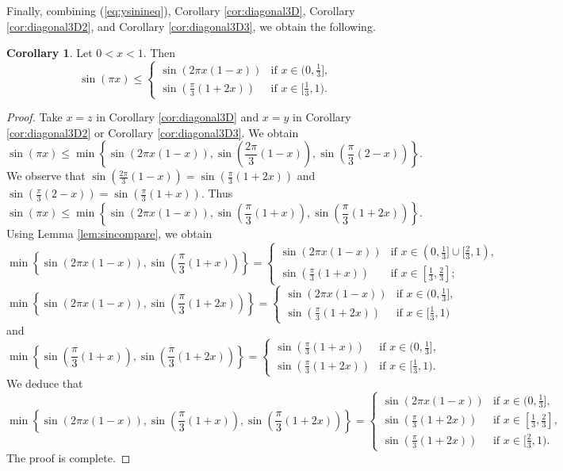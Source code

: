 \documentclass[12pt]{amsart}
\theoremstyle{definition}
\newtheorem{corollary}{Corollary}[section]
\begin{document}
Finally, combining (\ref{eq:ysinineq}), Corollary \ref{cor:diagonal3D}, Corollary \ref{cor:diagonal3D2}, and Corollary \ref{cor:diagonal3D3}, we obtain the following.
\begin{corollary}\label{cor:3Dto1D}
 Let $0<x<1$. Then
 \[
 \sin(\pi x)\leq \begin{cases}
    \sin\left(2\pi x(1-x)\right)
    & \text{if } x\in(0,\frac 13], \\[10pt]
    \sin\left(\frac{\pi}{3}(1+2x)\right)
    & \text{if } x\in[\frac 13,1).
  \end{cases}\]
\end{corollary}
\begin{proof}
Take $x=z$ in Corollary \ref{cor:diagonal3D}
and $x=y$ in Corollary \ref{cor:diagonal3D2} or Corollary \ref{cor:diagonal3D3}. We obtain
$$\sin(\pi x)\leq \min\left\{\sin(2\pi x(1-x)),\sin\left(\frac{2\pi}{3}(1-x)\right),\sin\left(\frac{\pi}{3}(2-x)\right)\right\}.$$
We observe that $\sin\left(\frac{2\pi}{3}(1-x)\right)=\sin\left(\frac{\pi}{3}(1+2x)\right)$ and $\sin\left(\frac{\pi}{3}(2-x)\right)=\sin\left(\frac{\pi}{3}(1+x)\right)$. Thus   $$\sin(\pi x)\leq \min\left\{\sin(2\pi x(1-x)),\sin\left(\frac{\pi}{3}(1+x)\right),\sin\left(\frac{\pi}{3}(1+2x)\right)\right\}.$$
Using Lemma \ref{lem:sincompare}, we obtain
\[
 \min\left\{\sin(2\pi x(1-x)),\sin\left(\frac{\pi}{3}(1+x)\right)\right\}= \begin{cases}
    \sin\left(2\pi x(1-x)\right)
    & \text{if } x\in(0,\frac 13]\cup [\frac 23,1), \\[10pt]
    \sin\left(\frac{\pi}{3}(1+x)\right)
    & \text{if } x\in[\frac 13,\frac 23];
  \end{cases}\]
  \[
 \min\left\{\sin(2\pi x(1-x)),\sin\left(\frac{\pi}{3}(1+2x)\right)\right\}= \begin{cases}
    \sin\left(2\pi x(1-x)\right)
    & \text{if } x\in(0,\frac 13], \\[10pt]
    \sin\left(\frac{\pi}{3}(1+2x)\right)
    & \text{if } x\in[\frac 13,1)
  \end{cases}\]
  and
  \[
 \min\left\{\sin\left(\frac{\pi}{3}(1+x)\right),\sin\left(\frac{\pi}{3}(1+2x)\right)\right\}= \begin{cases}
    \sin\left(\frac{\pi}{3}(1+x)\right)
    & \text{if } x\in(0,\frac 13], \\[10pt]
    \sin\left(\frac{\pi}{3}(1+2x)\right)
    & \text{if } x\in[\frac 13,1).
  \end{cases}\]
  We deduce that
   \[
 \min\left\{\sin(2\pi x(1-x)),\sin\left(\frac{\pi}{3}(1+x)\right),\sin\left(\frac{\pi}{3}(1+2x)\right)\right\}= \begin{cases}
    \sin\left(2\pi x(1-x)\right)
    & \text{if } x\in(0,\frac 13], \\[10pt]
    \sin\left(\frac{\pi}{3}(1+2x)\right)
    & \text{if } x\in[\frac 13,\frac 23], \\[10pt]
    \sin\left(\frac{\pi}{3}(1+2x)\right)
    & \text{if } x\in[\frac 23,1).
  \end{cases}\]
  The proof is complete.
\end{proof}
\end{document}
